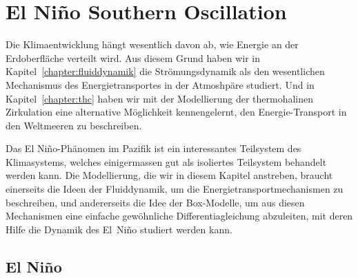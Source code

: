 %
%
%
\chapter{El Niño Southern Oscillation}
Die Klimaentwicklung hängt wesentlich davon ab, wie Energie an der
Erdoberfläche verteilt wird.
Aus diesem Grund haben wir in Kapitel~\ref{chapter:fluiddynamik}
die Strömungsdynamik als den wesentlichen Mechanismus des 
Energietransportes in der Atmoshpäre studiert.
Und in Kapitel~\ref{chapter:thc} haben wir mit der Modellierung der
thermohalinen Zirkulation eine alternative Möglichkeit kennengelernt,
den Energie-Transport in den Weltmeeren zu beschreiben.

Das El Niño-Phänomen im Pazifik ist ein interessantes Teilsystem des
Klimasystems, welches einigermassen gut als isoliertes Teilsystem 
behandelt werden kann.
Die Modellierung, die wir in diesem Kapitel anstreben, braucht
einerseits die Ideen der Fluiddynamik, um die Energietransportmechanismen
zu beschreiben, und andererseits die Idee der Box-Modelle, um aus diesen
Mechanismen eine einfache gewöhnliche Differentiagleichung abzuleiten,
mit deren Hilfe die Dynamik des El~Niño studiert werden kann.

\section{El Niño}





